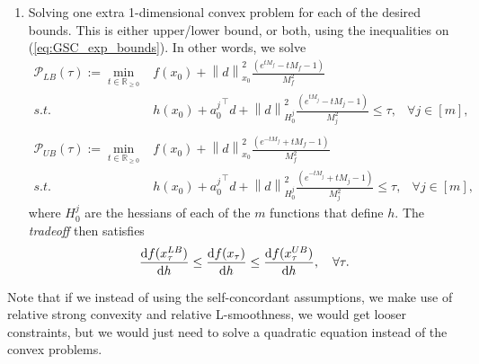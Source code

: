 \documentclass[11pt]{article}
\theoremstyle{definition}
\theoremstyle{remark}
\theoremstyle{plain}
\theoremstyle{definition}
\newcommand{\R}{\mathbb{R}}
\newcommand{\norm}[1]{\left\lVert #1 \right\rVert}
\newcommand{\1}{\mathbf{1}}
\renewcommand{\P}{\mathcal{P}}
\renewcommand{\t}{^{\top}}
\renewcommand{\R}{\mathbb{R}}
\begin{document}
\begin{enumerate}
    \item Solving one extra 1-dimensional convex problem for each of the desired bounds. This is either upper/lower bound, or both, using the inequalities on (\ref{eq:GSC_exp_bounds}). In other words, we solve
        \begin{equation}
\label{opt:LB_approx}
    \begin{array}{rlc}
      \displaystyle \P_{LB}(\tau):= \min_{t \in \R_{\geq 0}} &  f(x_0) + \norm{d}^2_{x_0} \frac{(e^{tM_f } - tM_f -1)}{M_f^2 }\\
        s.t. & h(x_0) + {a_0^j} \t d +  \norm{d}^2_{H_0^j} \frac{(e^{tM_j } - tM_j -1)}{M_j^2 }\leq \tau, & \forall j \in [m],\\
    \end{array}
\end{equation}
\begin{equation}
        \label{opt:UB_approx}
    \begin{array}{rlc}
      \displaystyle \P_{UB}(\tau):= \min_{t \in \R_{\geq 0}} &  f(x_0) + \norm{d}^2_{x_0} \frac{(e^{-tM_f } + tM_f -1)}{M_f^2 }\\
        s.t. & h(x_0) + {a_0^j} \t d +  \norm{d}^2_{H_0^j} \frac{(e^{-tM_j } + tM_j -1)}{M_j^2 }\leq \tau, & \forall j \in [m],%
    \end{array}
\end{equation}
where $H_0^j$ are the hessians of each of the $m$ functions that define $h$. The \textit{tradeoff} then satisfies
\begin{align*}
    \odv{f(x_\tau^{LB})}{h}\leq \odv{f(x_\tau)}{h} \leq \odv{f(x_\tau^{UB})}{h}, \quad \forall \tau.
\end{align*}
\end{enumerate}


Note that if we instead of using the self-concordant assumptions, we make use of relative strong convexity and relative L-smoothness, we would get looser constraints, but we would just need to solve a quadratic equation instead of the convex problems.

\end{document}
